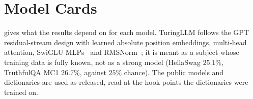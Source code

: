 \documentclass[10pt]{article}
\begin{document}

\section{Model Cards}
\label{app:corpus}

 gives what the results depend on for each model.
TuringLLM follows the GPT residual-stream design with learned absolute position embeddings, multi-head attention, SwiGLU MLPs~\citep{shazeer2020glu} and RMSNorm~\citep{zhang2019root}; it is meant as a subject whose training data is fully known, not as a strong model (HellaSwag $25.1\%$, TruthfulQA MC1 $26.7\%$, against $25\%$ chance).
The public models and dictionaries are used as released, read at the hook points the dictionaries were trained on.
\end{document}
